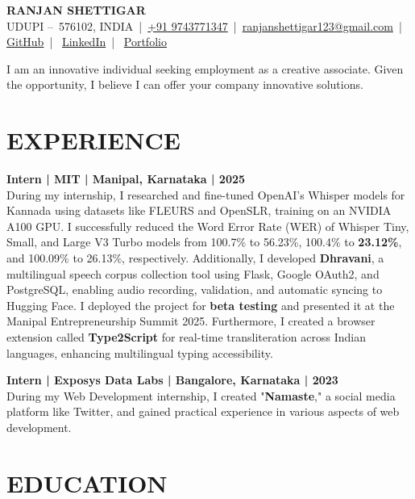 \documentclass[10pt, a4paper]{article}
\newcommand{\entrytitle}[4]{%
    {\fontsize{12pt}{14pt}\selectfont\textbf{#1 | #2 | #3 | #4}}\\[\parskip] %
}
\newcommand{\bodyfont}{\fontsize{10pt}{12pt}\selectfont\setstretch{1.5}} %
\newcommand{\phone}[1]{\href{tel:#1}{#1}}
\newcommand{\email}[1]{\href{mailto:#1}{#1}}
\begin{document}
\begin{center}
    {\fontsize{18pt}{22pt}\selectfont\bfseries RANJAN SHETTIGAR} %
    \\[1.2ex]
    {\fontsize{10pt}{12pt}\selectfont
     UDUPI – 576102, INDIA | \phone{+91 9743771347} | \email{ranjanshettigar123@gmail.com} | 
     \href{https://github.com/Ranjan-Shettigar}{GitHub} | 
     \href{https://www.linkedin.com/in/ranjanshettigar}{LinkedIn} | 
     \href{https://ranjan.pages.dev}{Portfolio}}
\end{center}

{\bodyfont
\justifying
I am an innovative individual seeking employment as a creative associate. Given the opportunity, I believe I can offer your company innovative solutions.
}

\section*{EXPERIENCE}

\entrytitle{Intern}{MIT}{Manipal, Karnataka}{2025}
{\bodyfont
\justifying
During my internship, I researched and fine-tuned OpenAI's Whisper models for Kannada using datasets like FLEURS and OpenSLR, training on an NVIDIA A100 GPU. I successfully reduced the Word Error Rate (WER) of Whisper Tiny, Small, and Large V3 Turbo models from 100.7\% to 56.23\%, 100.4\% to \textbf{23.12\%}, and 100.09\% to 26.13\%, respectively. Additionally, I developed \textbf{Dhravani}, a multilingual speech corpus collection tool using Flask, Google OAuth2, and PostgreSQL, enabling audio recording, validation, and automatic syncing to Hugging Face. I deployed the project for \textbf{beta testing} and presented it at the Manipal Entrepreneurship Summit 2025. Furthermore, I created a browser extension called \textbf{Type2Script} for real-time transliteration across Indian languages, enhancing multilingual typing accessibility.
}

\entrytitle{Intern}{Exposys Data Labs}{Bangalore, Karnataka}{2023}
{\bodyfont
\justifying
During my Web Development internship, I created "\textbf{Namaste}," a social media platform like Twitter, and gained practical experience in various aspects of web development.
}

\section*{EDUCATION}
\end{document}
